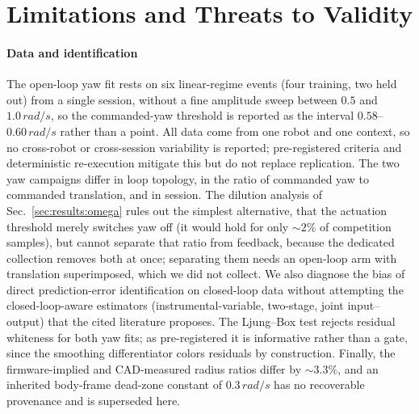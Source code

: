 \section{Limitations and Threats to Validity}
\label{sec:limitations}

\paragraph{Data and identification}
The open-loop yaw fit rests on six linear-regime events (four training, two
held out) from a single session, without a fine amplitude sweep between $0.5$
and $1.0\,\si{rad/s}$, so the commanded-yaw threshold is reported as the
interval $0.58$--$0.60\,\si{rad/s}$ rather than a point. All data come from one
robot and one context, so no cross-robot or cross-session variability is
reported; pre-registered criteria and deterministic re-execution mitigate this
but do not replace replication. The two yaw campaigns differ in loop topology,
in the ratio of commanded yaw to commanded translation, and in session. The
dilution analysis of Sec.~\ref{sec:results:omega} rules out the simplest
alternative, that the actuation threshold merely switches yaw off (it would
hold for only ${\sim}2\%$ of competition samples), but cannot separate that
ratio from feedback, because the dedicated collection removes both at once;
separating them needs an open-loop arm with translation superimposed, which we
did not collect. We also diagnose the bias of direct prediction-error identification on
closed-loop data without attempting the closed-loop-aware estimators
(instrumental-variable, two-stage, joint input--output) that the cited
literature proposes. The Ljung--Box test rejects residual whiteness for both yaw
fits; as pre-registered it is informative rather than a gate, since the
smoothing differentiator colors residuals by construction. Finally, the
firmware-implied and CAD-measured radius ratios differ by ${\sim}3.3\%$, and an
inherited body-frame dead-zone constant of $0.3\,\si{rad/s}$ has no recoverable
provenance and is superseded here.

